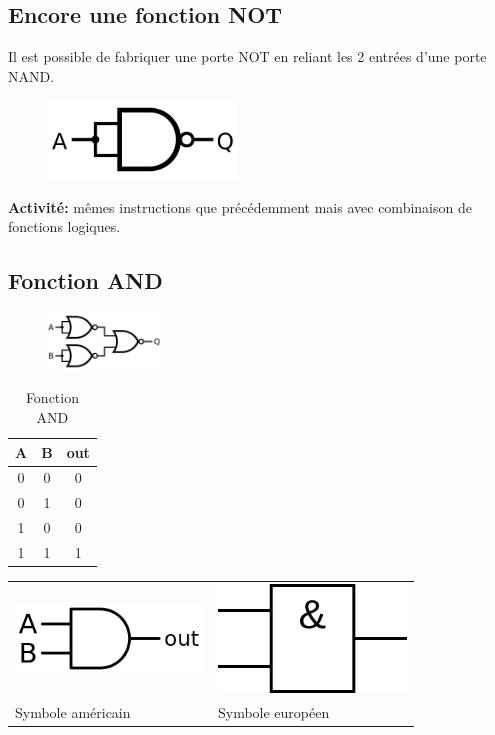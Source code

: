 \documentclass[a4paper,11pt]{article}
\begin{document}
\begin{Form}
\subsection{Encore une fonction NOT}
Il est possible de fabriquer une porte NOT en reliant les 2 entrées d'une porte NAND.
\begin{figure}[!h]
\centering
\includegraphics[width=5cm]{ressources/not-from-nand.png}
\label{not2}
\end{figure}
\begin{commentprof}
\textbf{Activité:} mêmes instructions que précédemment mais avec combinaison de fonctions logiques.
\end{commentprof}
\subsection{Fonction AND}
\begin{figure}[!h]
\centering
\includegraphics[width=3cm]{ressources/and-from-nor.png}
\label{and}
\end{figure}
\begin{table}[!h]
\begin{center}
\begin{tabular}{|c|c|c|}
\hline 
A & B & out \\ 
\hline 
0 & 0 & 0 \\ 
\hline 
0 & 1 & 0\\ 
\hline 
1 & 0 & 0\\
\hline 
1 & 1 & 1\\
\hline 
\end{tabular}
\caption{\label{not}Fonction AND}
\end{center}
\end{table} 
\begin{center}
\begin{tabular}{*{2}{>{\centering\arraybackslash}m{}}}
\includegraphics[width=5cm]{ressources/and-us.png}
  & 
\includegraphics[width=5cm]{ressources/and-eu.png}  
   \\
Symbole américain & Symbole européen
\end{tabular}
\end{center}

\end{Form}
\end{document}
